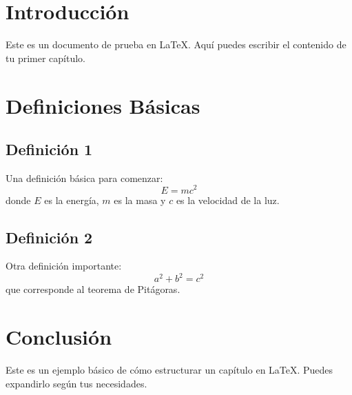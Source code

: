 \section{Introducción}
Este es un documento de prueba en \LaTeX. Aquí puedes escribir el contenido de tu primer capítulo.

\section{Definiciones Básicas}
\subsection{Definición 1}
Una definición básica para comenzar:
\[
E = mc^2
\]
donde $E$ es la energía, $m$ es la masa y $c$ es la velocidad de la luz.

\subsection{Definición 2}
Otra definición importante:
\[
a^2 + b^2 = c^2
\]
que corresponde al teorema de Pitágoras.

\section{Conclusión}
Este es un ejemplo básico de cómo estructurar un capítulo en \LaTeX. Puedes expandirlo según tus necesidades.
